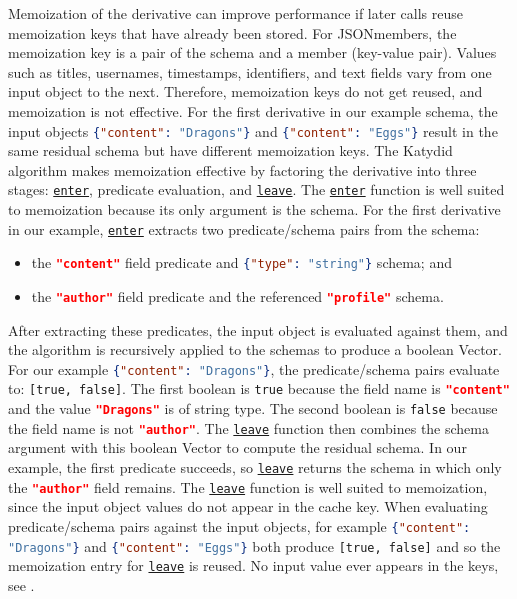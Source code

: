 \documentclass[runningheads]{llncs}
\newcommand{\link}[2]{\mbox{\hyperref[#2]{\lstinline{#1}}}\xspace}
\newcommand{\enter}{\link{enter}{def enter}}
\newcommand{\leave}{\link{leave}{def leave}}
\begin{document}
Memoization of the derivative can improve performance if later calls reuse memoization keys that have already been stored. 
For JSONmembers, the memoization key is a pair of the schema and a member (key-value pair). 
Values such as titles, usernames, timestamps, identifiers, and text fields vary from one input object to the next. 
Therefore, memoization keys do not get reused, and memoization is not effective. 
For the first derivative in our example schema, the input objects \lstinline[language=json]|{"content": "Dragons"}| and \lstinline[language=json]|{"content": "Eggs"}| result in the same residual schema but have different memoization keys.
The Katydid algorithm makes memoization effective by factoring the derivative into three stages: \enter, predicate evaluation, and \leave. 
The \enter function is well suited to memoization because its only argument is the schema. 
For the first derivative in our example, \enter extracts two predicate/schema pairs from the schema:
\begin{itemize}
  \item the \lstinline[language=json]|"content"| field predicate and
  \lstinline[language=json]|{"type": "string"}| schema; and
  \item the \lstinline[language=json]|"author"| field predicate and the referenced \lstinline[language=json]|"profile"| schema.
\end{itemize}
After extracting these predicates, the input object is evaluated against them, and the algorithm is recursively applied to the schemas to produce a boolean Vector. 
For our example \lstinline[language=json]|{"content": "Dragons"}|, the predicate/schema pairs evaluate to: \lstinline{[true, false]}. 
The first boolean is \lstinline{true} because the field name is \lstinline[language=json]|"content"| and the value \lstinline[language=json]|"Dragons"| is of string type. 
The second boolean is \lstinline{false} because the field name is not \lstinline[language=json]|"author"|.
The \leave function then combines the schema argument with this boolean Vector to compute the residual schema. 
In our example, the first predicate succeeds, so \leave returns the schema in which only the \lstinline[language=json]|"author"| field remains.
The \leave function is well suited to memoization, since the input object values do not appear in the cache key.
When evaluating predicate/schema pairs against the input objects, for example \lstinline[language=json]|{"content": "Dragons"}| and \lstinline[language=json]|{"content": "Eggs"}| both produce \lstinline{[true, false]} and so the memoization entry for \leave is reused.
No input value ever appears in the keys, see .
\end{document}
